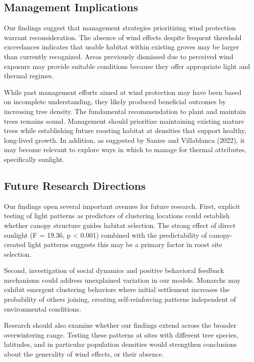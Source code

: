 \subsection{Management Implications}

Our findings suggest that management strategies prioritizing wind protection warrant reconsideration. The absence of wind effects despite frequent threshold exceedances indicates that usable habitat within existing groves may be larger than currently recognized. Areas previously dismissed due to perceived wind exposure may provide suitable conditions because they offer appropriate light and thermal regimes.

While past management efforts aimed at wind protection may have been based on incomplete understanding, they likely produced beneficial outcomes by increasing tree density. The fundamental recommendation to plant and maintain trees remains sound. Management should prioritize maintaining existing mature trees while establishing future roosting habitat at densities that support healthy, long-lived growth. In addition, as suggested by Saniee and Villablanca (2022), it may become relevant to explore ways in which to manage for thermal attributes, specifically sunlight.

\subsection{Future Research Directions}

Our findings open several important avenues for future research. First, explicit testing of light patterns as predictors of clustering locations could establish whether canopy structure guides habitat selection. The strong effect of direct sunlight (F = 19.36, p < 0.001) combined with the predictability of canopy-created light patterns suggests this may be a primary factor in roost site selection.

Second, investigation of social dynamics and positive behavioral feedback mechanisms could address unexplained variation in our models. Monarchs may exhibit emergent clustering behaviors where initial settlement increases the probability of others joining, creating self-reinforcing patterns independent of environmental conditions.

Research should also examine whether our findings extend across the broader overwintering range. Testing these patterns at sites with different tree species, latitudes, and in particular population densities would strengthen conclusions about the generality of wind effects, or their absence.

